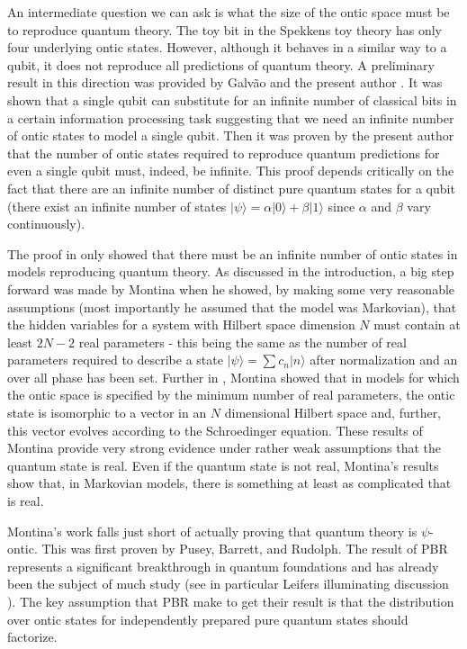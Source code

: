 \documentclass[12pt]{article}
\begin{document}
An intermediate question we can ask is what the size of the ontic space must be to reproduce quantum theory.  The toy bit in the Spekkens toy theory has only four underlying ontic states.
However, although it behaves in a similar way to a qubit, it does not reproduce all predictions of quantum theory.  A preliminary result in this direction was provided by Galv\~ao and the
present author \cite{galvao2003substituting}.  It was shown that a single qubit can substitute for an infinite number of classical bits in a certain information processing task suggesting
that we need an infinite number of ontic states to model a single qubit.   Then it was proven by the present author \cite{hardy2004quantum} that the number of ontic states required to
reproduce quantum predictions for even a single qubit must, indeed, be infinite.  This proof depends critically on the fact that there are an infinite number of distinct pure quantum states
for a qubit (there exist an infinite number of states $|\psi\rangle = \alpha |0\rangle +\beta |1\rangle$ since $\alpha$ and $\beta$ vary continuously).

The proof in \cite{hardy2004quantum} only showed that there must be an infinite number of ontic states in models reproducing quantum theory.  As discussed in the introduction, a big step
forward was made by Montina \cite{montina2008exponential} when he showed, by making some very reasonable assumptions (most importantly he assumed that the model was Markovian), that the
hidden variables for a system with Hilbert space dimension $N$ must contain at least $2N-2$ real parameters - this being the same as the number of real parameters required to describe a
state $|\psi\rangle=\sum c_n|n\rangle$ after normalization and an over all phase has been set.  Further in \cite{montina2011state}, Montina showed that in models for which the ontic space is
specified by the minimum number of real parameters, the ontic state is isomorphic to a vector in an $N$ dimensional Hilbert space and, further, this vector evolves according to the
Schroedinger equation.  These results of Montina provide very strong evidence under rather weak assumptions that the quantum state is real. Even if the quantum state is not real, Montina's
results show that, in Markovian models, there is something at least as complicated that is real.

Montina's work falls just short of actually proving that quantum theory is $\psi$-ontic.  This was first proven by Pusey, Barrett, and Rudolph.  The result of PBR represents a significant
breakthrough in quantum foundations and has already been the subject of much study \cite{hall2011generalisations, colbeck2012system, miller2012alternative, drezet2012can,
schlosshauer2012recent} (see in particular Leifers illuminating discussion \cite{Leifer2011}).  The key assumption that PBR make to get their result is that the distribution over ontic
states for independently prepared pure quantum states should factorize.
\end{document}

